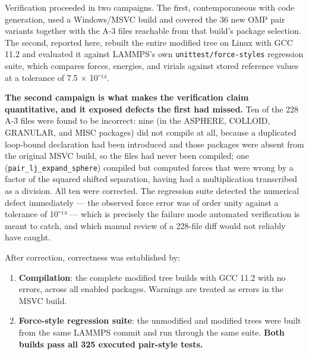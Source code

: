 \documentclass[
  11pt,
]{article}
\providecommand{\tightlist}{%
  \setlength{\itemsep}{0pt}\setlength{\parskip}{0pt}}
\providecommand{\tightlist}{%
  \setlength{\itemsep}{0pt}\setlength{\parskip}{0pt}}
\begin{document}
Verification proceeded in two campaigns. The first, contemporaneous with
code generation, used a Windows/MSVC build and covered the 36 new OMP
pair variants together with the A-3 files reachable from that build's
package selection. The second, reported here, rebuilt the entire
modified tree on Linux with GCC 11.2 and evaluated it against LAMMPS's
own \texttt{unittest/force-styles} regression suite, which compares
forces, energies, and virials against stored reference values at a
tolerance of 7.5 × 10⁻¹³.

\textbf{The second campaign is what makes the verification claim
quantitative, and it exposed defects the first had missed.} Ten of the
228 A-3 files were found to be incorrect: nine (in the ASPHERE, COLLOID,
GRANULAR, and MISC packages) did not compile at all, because a
duplicated loop-bound declaration had been introduced and those packages
were absent from the original MSVC build, so the files had never been
compiled; one (\texttt{pair\_lj\_expand\_sphere}) compiled but computed
forces that were wrong by a factor of the squared shifted separation,
having had a multiplication transcribed as a division. All ten were
corrected. The regression suite detected the numerical defect
immediately --- the observed force error was of order unity against a
tolerance of 10⁻¹³ --- which is precisely the failure mode automated
verification is meant to catch, and which manual review of a 228-file
diff would not reliably have caught.

After correction, correctness was established by:

\begin{enumerate}
\def\labelenumi{\arabic{enumi}.}
\tightlist
\item
  \textbf{Compilation}: the complete modified tree builds with GCC 11.2
  with no errors, across all enabled packages. Warnings are treated as
  errors in the MSVC build.
\item
  \textbf{Force-style regression suite}: the unmodified and modified
  trees were built from the same LAMMPS commit and run through the same
  suite. \textbf{Both builds pass all 325 executed pair-style tests.}
\end{enumerate}
\end{document}
